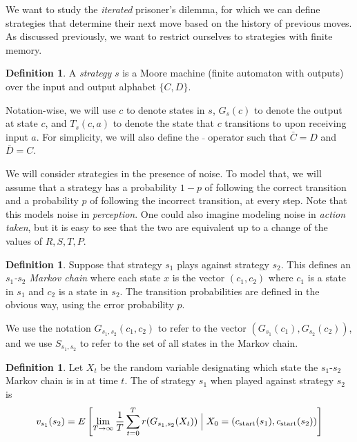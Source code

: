 \documentclass[11pt]{amsart}
\theoremstyle{definition}
\newtheorem{definition}[theorem]{Definition}
\theoremstyle{remark}
\begin{document}
We want to study the \textit{iterated} prisoner's dilemma, for which we can define strategies that determine their next move based on the history of previous moves. As discussed previously, we want to restrict ourselves to strategies with finite memory.

\begin{definition}
  A \textit{strategy} $s$ is a Moore machine (finite automaton with outputs) over the input and output alphabet $\{C, D\}$. 
\end{definition}

Notation-wise, we will use $c$ to denote states in $s$, $G_s(c)$ to denote the output at state $c$, and $T_s(c, a)$ to denote the state that $c$ transitions to upon receiving input $a$. For simplicity, we will also define the $\bar{\;}$ operator such that $\bar{C} = D$ and $\bar{D} = C$.

We will consider strategies in the presence of noise. To model that, we will assume that a strategy has a probability $1-p$ of following the correct transition and a probability $p$ of following the incorrect transition, at every step. Note that this models noise in \textit{perception}. One could also imagine modeling noise in \textit{action taken}, but it is easy to see that the two are equivalent up to a change of the values of $R, S, T, P$.

\begin{definition}
  Suppose that strategy $s_1$ plays against strategy $s_2$. This defines an \textit{$s_1$-$s_2$ Markov chain} where each state $x$ is the vector $(c_1,c_2)$ where $c_1$ is a state in $s_1$ and $c_2$ is a state in $s_2$. The transition probabilities are defined in the obvious way, using the error probability $p$.
\end{definition}

We use the notation $G_{s_1,s_2}(c_1,c_2)$ to refer to the vector $(G_{s_1}(c_1), G_{s_2}(c_2))$, and we use $S_{s_1,s_2}$ to refer to the set of all states in the Markov chain.

\begin{definition}
  \label{strategypayoffs}
  Let $X_t$ be the random variable designating which state the $s_1$-$s_2$ Markov chain is in at time $t$. The  of strategy $s_1$ when played against strategy $s_2$ is 
  \begin{equation*}
    v_{s_1}(s_2) = E \left[ \lim_{T \to \infty} \frac{1}{T} \sum_{t=0}^T r(G_{s_1,s_2} (X_t)) \Bigm| X_0 = (c_{\text{start}}(s_1), c_{\text{start}}(s_2)) \right]
  \end{equation*}
\end{definition}
\end{document}
